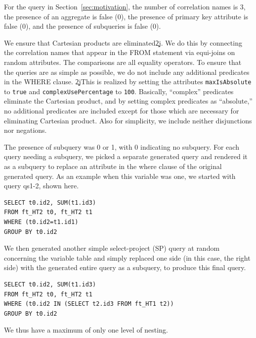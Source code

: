 \documentclass[prodmode,acmtods]{acmsmall}
\begin{document}
For the query in Section~\ref{sec:motivation}, the number of correlation
names is 3, the presence of an aggregate
is false (0), the presence of primary key attribute is false (0),
and the presence of subqueries is false (0).

{}We ensure that Cartesian products are
eliminated\c2j{.}{}  We do this by
connecting the correlation names that appear in the FROM statement via
equi-joins on random attributes. The comparisons are all
equality operators. To ensure that the queries are as simple as possible, we
do not include any additional predicates in the WHERE clause.  \c2j{}{This
  is realized by setting the attributes {\tt maxIsAbsolute} to {\tt true}
  and {\tt complexUsePercentage} to {\tt 100}.  Basically, ``complex''
  predicates eliminate the Cartesian product, and by setting complex
  predicates as ``absolute,'' no additional predicates are included except
  for those which are necessary for eliminating Cartesian product.} Also
for simplicity, we include neither disjunctions nor negations.


The presence of subquery was 0 or 1, with 0 indicating no
subquery. For each query needing a subquery, we picked a separate generated query and
rendered it as a subquery to replace an attribute in the where clause of the
original generated query. As an example when this variable was one, we
started with query qs1-2, shown here.

\begin{verbatim}
SELECT t0.id2, SUM(t1.id3)
FROM ft_HT2 t0, ft_HT2 t1
WHERE (t0.id2=t1.id1)
GROUP BY t0.id2
\end{verbatim}

We then generated another simple select-project (SP) 
query at random concerning the variable table 
and simply replaced one side (in this case, the right side) with the generated entire 
query as a subquery, to produce this final query.

\begin{verbatim}
SELECT t0.id2, SUM(t1.id3)
FROM ft_HT2 t0, ft_HT2 t1
WHERE (t0.id2 IN (SELECT t2.id3 FROM ft_HT1 t2)) 
GROUP BY t0.id2
\end{verbatim}
We thus have a maximum of only one level of nesting.
\end{document}
